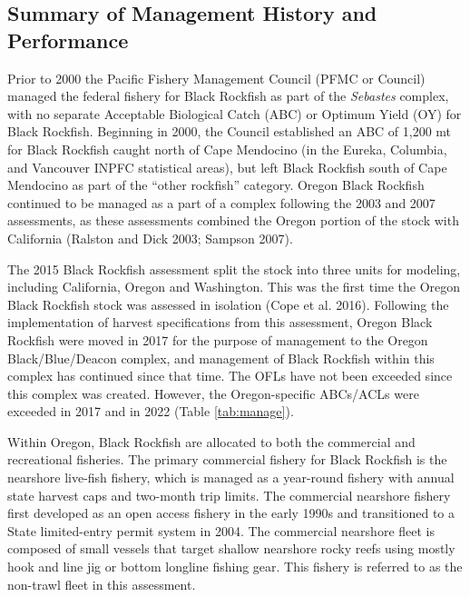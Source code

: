 \documentclass[11pt,
  english,
  letterpaper,
]{article}
\begin{document}
\hypertarget{summary-of-management-history-and-performance}{%
\subsection{Summary of Management History and Performance}\label{summary-of-management-history-and-performance}}

Prior to 2000 the Pacific Fishery Management Council (PFMC or Council) managed the federal fishery for Black Rockfish as part of the \emph{Sebastes} complex, with no separate Acceptable Biological Catch (ABC) or Optimum Yield (OY) for Black Rockfish. Beginning in 2000, the Council established an ABC of 1,200 mt for Black Rockfish caught north of Cape Mendocino (in the Eureka, Columbia, and Vancouver INPFC statistical areas), but left Black Rockfish south of Cape Mendocino as part of the ``other rockfish'' category. Oregon Black Rockfish continued to be managed as a part of a complex following the 2003 and 2007 assessments, as these assessments combined the Oregon portion of the stock with California (Ralston and Dick 2003; Sampson 2007).

The 2015 Black Rockfish assessment split the stock into three units for modeling, including California, Oregon and Washington. This was the first time the Oregon Black Rockfish stock was assessed in isolation (Cope et al. 2016). Following the implementation of harvest specifications from this assessment, Oregon Black Rockfish were moved in 2017 for the purpose of management to the Oregon Black/Blue/Deacon complex, and management of Black Rockfish within this complex has continued since that time. The OFLs have not been exceeded since this complex was created. However, the Oregon-specific ABCs/ACLs were exceeded in 2017 and in 2022 (Table \ref{tab:manage}).

Within Oregon, Black Rockfish are allocated to both the commercial and recreational fisheries. The primary commercial fishery for Black Rockfish is the nearshore live-fish fishery, which is managed as a year-round fishery with annual state harvest caps and two-month trip limits. The commercial nearshore fishery first developed as an open access fishery in the early 1990s and transitioned to a State limited-entry permit system in 2004. The commercial nearshore fleet is composed of small vessels that target shallow nearshore rocky reefs using mostly hook and line jig or bottom longline fishing gear. This fishery is referred to as the non-trawl fleet in this assessment.
\end{document}
